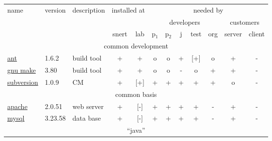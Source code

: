 \begin{table}[htbp]
  \centering
  \small
  \begin{tabular}[t]{|lll|cc|ccccccc|}
    \hline
    name & version & description & \multicolumn{2}{|c|}{installed at} & \multicolumn{7}{|c|}{needed by}
    \\
    &
    &
    &
    &
    &
    \multicolumn{5}{|c}{developers}
    &
    \multicolumn{2}{c|}{customers}
    \\
    & &
    &
    snert
    &
    lab
    &
    p$_1$
    &
    p$_2$
    &
    j
    &
    test
    &
    org
    &
    server%
    &
    client%
    \\\hline%
    \multicolumn{12}{|c|}{common development}
    \\\hline
    \href{http://ant.apache.org/}{ant} 
    &
    1.6.2 %
    &
    build tool %
    & 
    +  %
    & 
    +  %
    &
    o %
    &
    o %
    &
    + %
    &
    [+] %
    & 
    o %
    &
    + %
    &
    - %
    \\
    \href{http://www.gnu.org/software/make}{gnu make} 
    &
    3.80 %
    &
    build tool %
    & 
    +  %
    & 
    +  %
    &
    o %
    &
    o %
    &
    - %
    &
    o %
    & 
    + %
    &
    + %
    &
    - %
    \\
    \href{http://subversion.tigris.org/}{subversion}
    &
    1.0.9 %
    & 
    CM %
    & 
    +  %
    & 
    [+]  %
    &
    + %
    &
    + %
    &
    + %
    &
    + %
    & 
    + %
    &
    o %
    &
    - %
    \\\hline
    \multicolumn{12}{|c|}{common basis}
    \\\hline
    \href{http://www.apache.org}{apache}
    &
    2.0.51 %
    & 
    web server %
    & 
    +  %
    & 
    [-]  %
    &
    + %
    &
    + %
    &
    + %
    &
    + %
    & 
    - %
    &
    + %
    &
    - %
    \\
    \href{http://www.mysql.org}{mysql}
    &
    3.23.58 %
    & 
    data base %
    & 
    +  %
    & 
    [-]  %
    &
    + %
    &
    + %
    &
    + %
    &
    + %
    & 
    - %
    &
    + %
    &
    - %
    \\\hline
    \multicolumn{12}{|c|}{``java''}
    \\\hline

\end{tabular}
\end{table}

